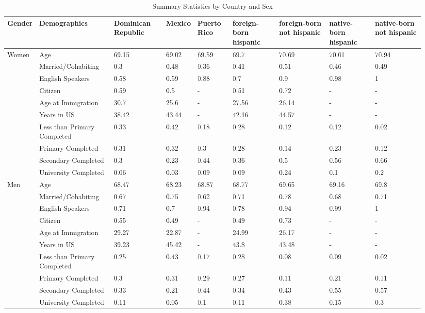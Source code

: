 \begin{table}[ht]
\centering
\caption{Summary Statistics by Country and Sex} 
\begingroup\small
\begin{tabular}{l|l|lllllll}
  \hline
Gender & Demographics & Dominican Republic & Mexico & Puerto Rico & foreign-born hispanic & foreign-born not hispanic & native-born hispanic & native-born not hispanic \\ 
  \hline
Women & Age & 69.15 & 69.02 & 69.59 & 69.7 & 70.69 & 70.01 & 70.94 \\ 
   & Married/Cohabiting & 0.3 & 0.48 & 0.36 & 0.41 & 0.51 & 0.46 & 0.49 \\ 
   & English Speakers & 0.58 & 0.59 & 0.88 & 0.7 & 0.9 & 0.98 & 1 \\ 
   & Citizen & 0.59 & 0.5 & - & 0.51 & 0.72 & - & - \\ 
   & Age at Immigration & 30.7 & 25.6 & - & 27.56 & 26.14 & - & - \\ 
   & Years in US & 38.42 & 43.44 & - & 42.16 & 44.57 & - & - \\ 
   & Less than Primary Completed & 0.33 & 0.42 & 0.18 & 0.28 & 0.12 & 0.12 & 0.02 \\ 
   & Primary Completed & 0.31 & 0.32 & 0.3 & 0.28 & 0.14 & 0.23 & 0.12 \\ 
   & Secondary Completed & 0.3 & 0.23 & 0.44 & 0.36 & 0.5 & 0.56 & 0.66 \\ 
   & University Completed & 0.06 & 0.03 & 0.09 & 0.09 & 0.24 & 0.1 & 0.2 \\ 
  Men & Age & 68.47 & 68.23 & 68.87 & 68.77 & 69.65 & 69.16 & 69.8 \\ 
   & Married/Cohabiting & 0.67 & 0.75 & 0.62 & 0.71 & 0.78 & 0.68 & 0.71 \\ 
   & English Speakers & 0.71 & 0.7 & 0.94 & 0.78 & 0.94 & 0.99 & 1 \\ 
   & Citizen & 0.55 & 0.49 & - & 0.49 & 0.73 & - & - \\ 
   & Age at Immigration & 29.27 & 22.87 & - & 24.99 & 26.17 & - & - \\ 
   & Years in US & 39.23 & 45.42 & - & 43.8 & 43.48 & - & - \\ 
   & Less than Primary Completed & 0.25 & 0.43 & 0.17 & 0.28 & 0.08 & 0.09 & 0.02 \\ 
   & Primary Completed & 0.3 & 0.31 & 0.29 & 0.27 & 0.11 & 0.21 & 0.11 \\ 
   & Secondary Completed & 0.33 & 0.21 & 0.44 & 0.34 & 0.43 & 0.55 & 0.57 \\ 
   & University Completed & 0.11 & 0.05 & 0.1 & 0.11 & 0.38 & 0.15 & 0.3 \\ 
   \hline
\end{tabular}
\endgroup
\end{table}
